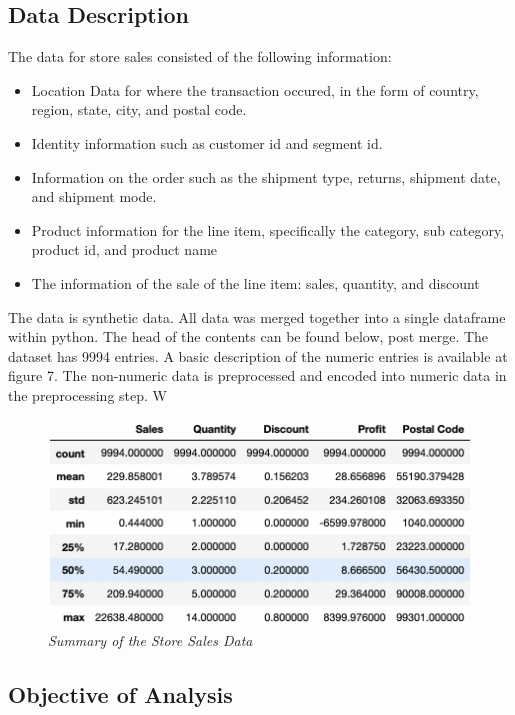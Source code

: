 \subsection{Data Description}

The data for store sales consisted of the following information: \cite{tableau_community_forums_2021}

\begin{itemize}
        \item Location Data for where the transaction occured, in the form of country, region, state, city, and postal code.
        \item Identity information such as customer id and segment id.
        \item Information on the order such as the shipment type, returns, shipment date, and shipment mode.
        \item Product information for the line item, specifically the category, sub category, product id, and product name
        \item The information of the sale of the line item: sales, quantity, and discount
\end{itemize}

The data is synthetic data. All data was merged together into a single dataframe within python. The head of the contents can be found below, post merge. The dataset has 9994 entries. A basic description of the numeric entries is available at figure 7. The non-numeric data is preprocessed and encoded into numeric data in the preprocessing step. W

\begin{figure}[H]
	\centering
        \includegraphics[width=1.0\linewidth]{images/ssd_stats.png}
	\caption{\textit{Summary of the Store Sales Data}}
	\label{fig:fig5}
\end{figure}

\subsection{Objective of Analysis}

